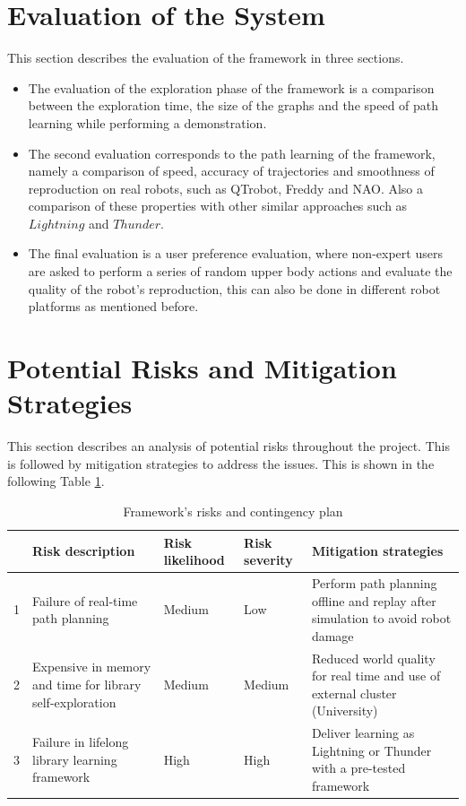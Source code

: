 \documentclass[thesis]{mas_proposal}
\begin{document}
\section{Evaluation of the System}

	This section describes the evaluation of the framework in three sections. 
	
	\begin{itemize}
		
		\item The evaluation of the exploration phase of the framework is a comparison between the exploration time, the size of the graphs and the speed of path learning while performing a demonstration.
		
		\item The second evaluation corresponds to the path learning of the framework, namely a comparison of speed, accuracy of trajectories and smoothness of reproduction on real robots, such as QTrobot, Freddy and NAO.
		Also a comparison of these properties with other similar approaches such as $Lightning$ and $Thunder$. 
		
		\item The final evaluation is a user preference evaluation, where non-expert users are asked to perform a series of random upper body actions and evaluate the quality of the robot's reproduction, this can also be done in different robot platforms as mentioned before.
	
	\end{itemize}

\section{Potential Risks and Mitigation Strategies}

	This section describes an analysis of potential risks throughout the project. This is followed by mitigation strategies to address the issues. This is shown in the following Table \ref{table:risks_and_mitigation}.
	
	\begin{table}[h]
		\begin{tabular}{|p{0.3cm}|p{3.2cm}|p{2.6cm}|p{2.6cm}|p{3.9cm}|}
			\rowcolor{Gray}
			\hline
			& Risk description & Risk likelihood & Risk severity & Mitigation strategies\\
			\hline 
			1 & Failure of real-time path planning & Medium & Low & Perform path planning offline and replay after simulation to avoid robot damage \\
			\hline
			2 & Expensive in memory and time for library self-exploration & Medium & Medium & Reduced world quality for real time and use of external cluster (University) \\
			\hline
			3 & Failure in lifelong library learning framework & High & High & Deliver learning as Lightning or Thunder with a pre-tested framework \\
			\hline
		\end{tabular}
	\caption{Framework's risks and contingency plan}	
	\label{table:risks_and_mitigation}
	\end{table}
	
\end{document}
